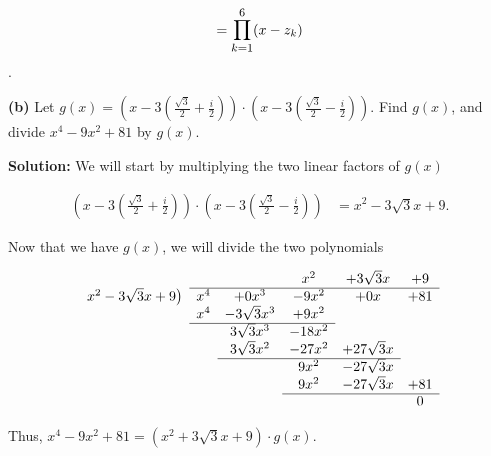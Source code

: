 \documentclass[12pt, a4paper]{article}
\begin{document}
\centerline{\[ = \mathlarger{\prod\limits_{k=1}^{6}} (x-z_k) \].}

\vspace{6mm}\par

\textbf{(b)} Let $g(x)=(x-3(\frac{\sqrt{3}}{2}+\frac{i}{2}))\cdot(x-3(\frac{\sqrt{3}}{2}-\frac{i}{2}))$. Find $g(x)$, and divide $x^4-9x^2+81$ by $g(x)$.

\vspace{4mm}

\noindent\textbf{Solution:} We will start by multiplying the two linear factors of $g(x)$

\newpage
 
     \begin{equation*}
        \begin{split}
            (x-3(\frac{\sqrt{3}}{2}+\frac{i}{2}))\cdot(x-3(\frac{\sqrt{3}}{2}-\frac{i}{2})) &= x^2-3\sqrt{3}x+9.
        \end{split}
    \end{equation*}
    
\vspace{4mm}

\noindent Now that we have $g(x)$, we will divide the two polynomials

\vspace{4mm}


\[
\begin{array}{m{3.5em}cccccc}
&      &       &         & x^2   & +3\sqrt{3}x & +9\\
\cline{3-7}
\multicolumn{2}{l}{x^2-3\sqrt{3}x+9\big)}
       & x^4  &  +0x^3          & -9x^2 & +0x         & +81 \\
&      & x^4  &  -3\sqrt{3}x^3  & +9x^2 &             &  \\
\cline{3-5}
&    &  &  3\sqrt{3}x^3  &  -18x^2  &          &   \\
&    &  &  3\sqrt{3}x^2  &  -27x^2  & +27\sqrt{3}x &  \\
\cline{4-6}
&    &    &   & 9x^2 &  -27\sqrt{3}x &   \\
&    &    &   & 9x^2 &  -27\sqrt{3}x & +81\\
\cline{5-7}
&    &    &    &   &  & 0\\
\end{array}
\]

 
\vspace{4mm}
 
\noindent Thus, $x^4-9x^2+81=(x^2+3\sqrt{3}x+9)\cdot g(x)$.
\end{document}
